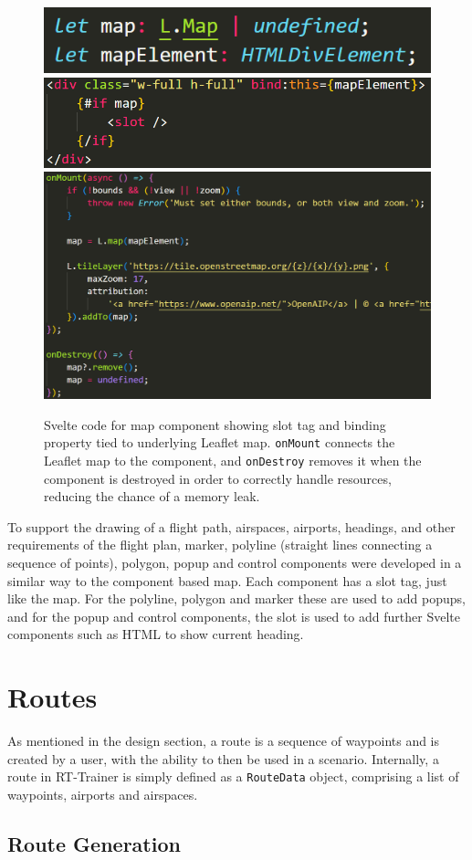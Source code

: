 \begin{figure}
    \centering
    \includegraphics[width=0.25\linewidth]{document-resources//images/map-leaflet-variables.png}
    \includegraphics[width=0.25\linewidth]{document-resources//images/map-svelte-component-rough.png}
    \includegraphics[width=0.25\linewidth]{document-resources//images/map-onmount.png}
    \caption{Svelte code for map component showing slot tag and binding property tied to underlying Leaflet map. \texttt{onMount} connects the Leaflet map to the component, and \texttt{onDestroy} removes it when the component is destroyed in order to correctly handle resources, reducing the chance of a memory leak.}
    \label{fig:map-svelte-component}
\end{figure}

To support the drawing of a flight path, airspaces, airports, headings, and other requirements of the flight plan, marker, polyline (straight lines connecting a sequence of points), polygon, popup and control components were developed in a similar way to the component based map. Each component has a slot tag, just like the map. For the polyline, polygon and marker these are used to add popups, and for the popup and control components, the slot is used to add further Svelte components such as HTML to show current heading. 

\section{Routes}
\label{se:routes}
As mentioned in the design section, a route is a sequence of waypoints and is created by a user, with the ability to then be used in a scenario. Internally, a route in RT-Trainer is simply defined as a \texttt{RouteData} object, comprising a list of waypoints, airports and airspaces.

\subsection{Route Generation}
\label{sse:routegen}

